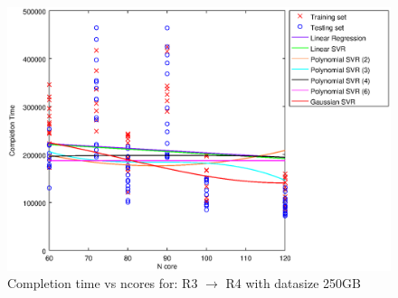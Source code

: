 
\begin {figure}[hbtp]
\centering
\includegraphics[width=\textwidth]{output/R3_R4_250_ALL_FEATURES/plot_R3_R4_250.eps}
\caption{Completion time vs ncores for: R3 $\rightarrow$ R4 with datasize 250GB}
\label{fig:coreonly_linear_R3_R4_250}
\end {figure}
